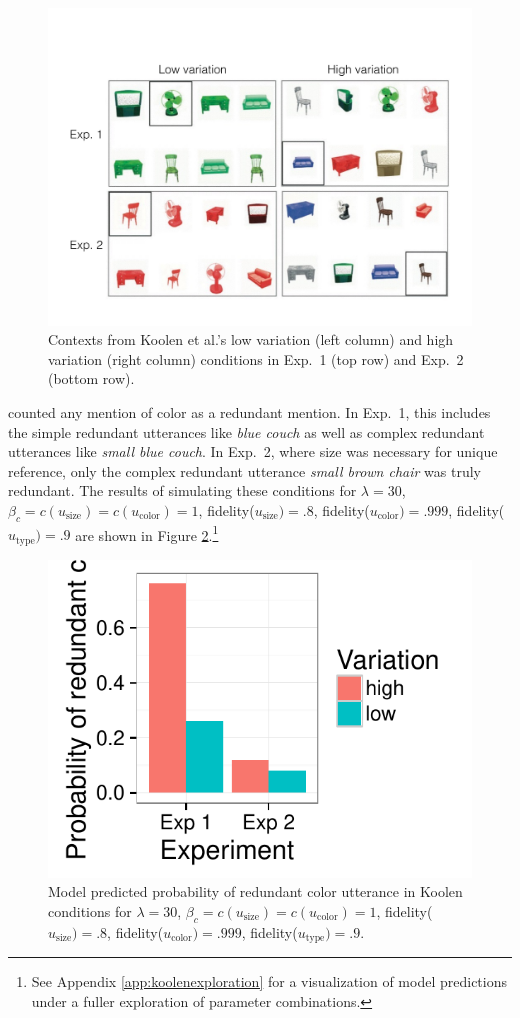 \documentclass[11pt]{article}
\newcommand{\figref}[1]{Figure \ref{#1}}
\newcommand{\appref}[1]{Appendix \ref{#1}}
\begin{document}
\begin{figure}
\centering
\includegraphics[width=\textwidth]{pics/koolen-conditions}
\caption{Contexts from Koolen et al.'s low variation (left column) and high variation (right column) conditions in Exp.~1 (top row) and Exp.~2 (bottom row).}
\label{fig:koolencontexts}
\end{figure}

 counted any mention of color as a redundant mention. In Exp.~1, this includes the simple redundant utterances like \emph{blue couch} as well as complex redundant utterances like \emph{small blue couch}. In Exp.~2, where size was necessary for unique reference, only the complex redundant utterance \emph{small brown chair} was truly redundant.  The results of simulating these conditions for $\lambda = 30$, $ \beta_c = c(u_{\textrm{size}}) = c(u_{\textrm{color}}) = 1$, fidelity($u_{\textrm{size}}) = .8$, fidelity($u_{\textrm{color}}) = .999$, fidelity($u_{\textrm{type}}) = .9$ are shown in \figref{fig:koolensimulationresults}.\footnote{See \appref{app:koolenexploration} for a visualization of model predictions under a fuller exploration of parameter combinations.}


\begin{figure}
\centering
\includegraphics[width=.4\textwidth]{pics/koolen-effect}
\caption{Model predicted probability of redundant color utterance in Koolen conditions for $\lambda = 30$, $ \beta_c = c(u_{\textrm{size}}) = c(u_{\textrm{color}}) = 1$, fidelity($u_{\textrm{size}}) = .8$, fidelity($u_{\textrm{color}}) = .999$, fidelity($u_{\textrm{type}}) = .9$.}
\label{fig:koolensimulationresults}
\end{figure}
\end{document}
